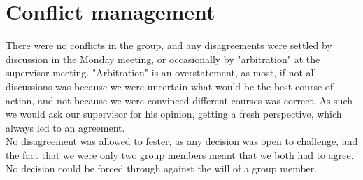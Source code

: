 \section{Conflict management}
There were no conflicts in the group, and any disagreements were settled by discussion in the Monday meeting, or occasionally by "arbitration" at the supervisor meeting. "Arbitration" is an overstatement, as most, if not all, discussions was because we were uncertain what would be the best course of action, and not because we were convinced different courses was correct. As such we would ask our supervisor for his opinion, getting a fresh perspective, which always led to an agreement.\\
No disagreement was allowed to fester, as any decision was open to challenge, and the fact that we were only two group members meant that we both had to agree. No decision could be forced through against the will of a group member.
